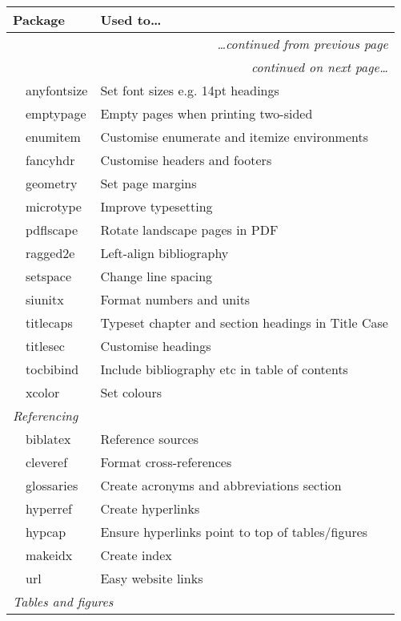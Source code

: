 
\begin{longtable}{l >{\ttfamily}l l}
    \toprule
    \multicolumn{2}{l}{\textnormal{Package}} & Used to\dots\\
    \midrule
    \endfirsthead
    \multicolumn{3}{r}{\small\textit{\dots continued from previous page}}\\
    \midrule
    \endhead
    \midrule
    \multicolumn{3}{r}{\small\textit{continued on next page\dots}}
    \endfoot
    \endlastfoot
    \multicolumn{3}{l}{\textit{Typesetting}}\\
    & anyfontsize & Set font sizes e.g. 14pt headings\\
    & emptypage & Empty pages when printing two-sided\\
    & enumitem & Customise enumerate and itemize environments\\
    & fancyhdr & Customise headers and footers\\
    & geometry & Set page margins\\
    & microtype & Improve typesetting\\
    & pdflscape & Rotate landscape pages in PDF\\
    & ragged2e & Left-align bibliography\\
    & setspace & Change line spacing\\
    & siunitx & Format numbers and units\\
    & titlecaps & Typeset chapter and section headings in Title Case\\
    & titlesec & Customise headings\\
    & tocbibind & Include bibliography etc in table of contents\\
    & xcolor & Set colours\\
    \multicolumn{3}{l}{\textit{Referencing}}\\
    & biblatex & Reference sources\\
    & cleveref & Format cross-references\\
    & glossaries & Create acronyms and abbreviations section\\
    & hyperref & Create hyperlinks\\
    & hypcap & Ensure hyperlinks point to top of tables/figures\\
    & makeidx & Create index\\
    & url & Easy website links\\
    \multicolumn{3}{l}{\textit{Tables and figures}}\\

\end{longtable}
